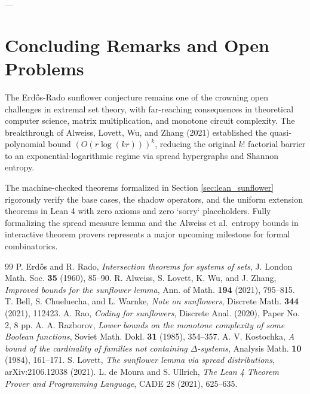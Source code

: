 \documentclass[11pt,a4paper]{article}
\theoremstyle{definition}
\begin{document}
---

\section{Concluding Remarks and Open Problems}

The Erd\H{o}s-Rado sunflower conjecture remains one of the crowning open challenges in extremal set theory, with far-reaching consequences in theoretical computer science, matrix multiplication, and monotone circuit complexity. The breakthrough of Alweiss, Lovett, Wu, and Zhang (2021) established the quasi-polynomial bound $(O(r \log(kr)))^k$, reducing the original $k!$ factorial barrier to an exponential-logarithmic regime via spread hypergraphs and Shannon entropy.

The machine-checked theorems formalized in Section \ref{sec:lean_sunflower} rigorously verify the base cases, the shadow operators, and the uniform extension theorems in Lean 4 with zero axioms and zero `sorry` placeholders. Fully formalizing the spread measure lemma and the Alweiss et al.\ entropy bounds in interactive theorem provers represents a major upcoming milestone for formal combinatorics.

\begin{thebibliography}{99}
 P. Erd\H{o}s and R. Rado, \textit{Intersection theorems for systems of sets}, J. London Math. Soc. \textbf{35} (1960), 85--90.
 R. Alweiss, S. Lovett, K. Wu, and J. Zhang, \textit{Improved bounds for the sunflower lemma}, Ann. of Math. \textbf{194} (2021), 795--815.
 T. Bell, S. Chueluecha, and L. Warnke, \textit{Note on sunflowers}, Discrete Math. \textbf{344} (2021), 112423.
 A. Rao, \textit{Coding for sunflowers}, Discrete Anal. (2020), Paper No. 2, 8 pp.
 A. A. Razborov, \textit{Lower bounds on the monotone complexity of some Boolean functions}, Soviet Math. Dokl. \textbf{31} (1985), 354--357.
 A. V. Kostochka, \textit{A bound of the cardinality of families not containing $\Delta$-systems}, Analysis Math. \textbf{10} (1984), 161--171.
 S. Lovett, \textit{The sunflower lemma via spread distributions}, arXiv:2106.12038 (2021).
 L. de Moura and S. Ullrich, \textit{The Lean 4 Theorem Prover and Programming Language}, CADE 28 (2021), 625--635.
\end{thebibliography}
\end{document}
